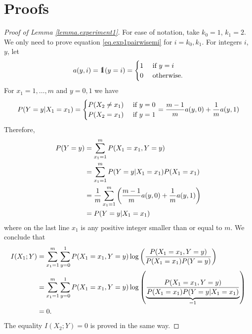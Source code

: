 \section{Proofs}

\begin{proof}[Proof of Lemma \ref{lemma.experiment1}]
	For ease of notation, 
	take 
	$k_0 = 1$, 
	$k_1 = 2$. 
	We only need to prove equation \eqref{eq.exp1pairwisemi}
	for $i = k_0, k_1$. 
	For integers $i$, $y$, 
	let 
	\begin{equation*}
		a(y, i) = \one(y = i) 
		= 
		\begin{cases}
			1 & \text{ if } y = i
			\\
			0 & \text{ otherwise}.
		\end{cases}
	\end{equation*}
	For 
	$x_1 = 1, \dots, m$
	and
	$y = 0, 1$
	we have
	\begin{equation*}
		{{P}}(Y = y \vert X_1 = x_1)
		=
		\begin{cases}
			{{P}}(X_2 \neq x_1) & \text { if } y = 0
			\\
			{{P}}(X_2 = x_1) & \text { if } y = 1
		\end{cases}
		=
		\frac{m-1}{m} a(y, 0)
		+
		\frac{1}{m} a(y, 1)
	\end{equation*}
	Therefore,
	\begin{equation*}
		\begin{split}
			{{P}}(Y = y) 
			& =
			\sum_{x_1 = 1}^{m}
			{{P}}(X_1 = x_1, Y = y)
			\\
			& = 
			\sum_{x_1 = 1}^{m}
			{{P}}(Y = y \vert X_1 = x_1)
			{{P}}(X_1 = x_1)
			\\
			& = 
			\frac{1}{m}
			\sum_{x_1 = 1}^{m}
			\left(
			\frac{m-1}{m} a(y, 0)
			+
			\frac{1}{m} a(y, 1)
			\right)
			\\
			& = 
			{{P}}(Y = y \vert X_1 = x_1)
		\end{split}
	\end{equation*}
	where on the last line $x_1$ is any positive integer smaller than or equal to $m$. 
	We conclude that
	\begin{equation*}
		\begin{split}
		I(X_1; Y)
		& = 
		\sum_{x_1 = 1}^{m}
		\sum_{y=0}^{1}
		{{P}}(X_1 = x_1, Y = y)
		\log
		\left(
		\frac{
		{{P}}(X_1 = x_1, Y = y)
		}
		{
			{{P}}(X_1 = x_1){{P}}(Y=y)
		}
		\right)
		\\
		& = 
		\sum_{x_1 = 1}^{m}
		\sum_{y=0}^{1}
		{{P}}(X_1 = x_1, Y = y)
		\log
		\left(
		\underbrace{
		\frac{
		{{P}}(X_1 = x_1, Y = y)
		}
		{
			{{P}}(X_1 = x_1)
			{{P}}(Y = y \vert X_1 = x_1)
		}
		}_{ = 1}
		\right)
		\\
		& = 
		0.
		\end{split}
	\end{equation*}
	The equality $I(X_2; Y) = 0$ is proved in the same way. 


\end{proof}
